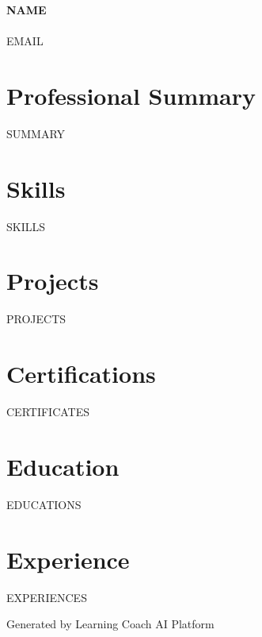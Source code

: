 \documentclass[11pt]{article}
\begin{document}
\begin{center}
  {\LARGE \textbf{{{NAME}}}}\\
  \\ 
  {\small {{{EMAIL}}}}
\end{center}

\section*{Professional Summary}
{{SUMMARY}}


\section*{Skills}
{{SKILLS}}

\section*{Projects}
{{PROJECTS}}

\section*{Certifications}
{{CERTIFICATES}}

\section*{Education}
{{EDUCATIONS}}

\section*{Experience}
{{EXPERIENCES}}

\vfill
\begin{center}
  Generated by Learning Coach AI Platform
\end{center}
\end{document}
